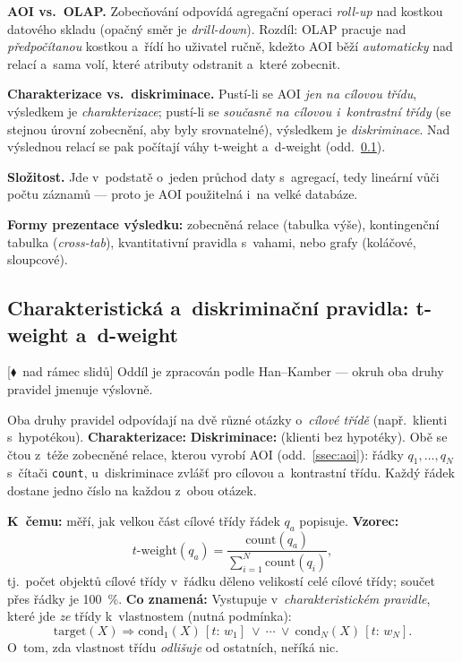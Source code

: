 \documentclass[11pt,a4paper]{article}
\theoremstyle{definition}
\newcommand{\mimo}{\textcolor{markcol}{\textsf{\footnotesize[$\blacklozenge$~nad rámec slidů]}}}
\begin{document}
\begin{poznbox}
\textbf{AOI vs.\ OLAP.} Zobecňování odpovídá agregační operaci \emph{roll-up} nad kostkou
datového skladu (opačný směr je \emph{drill-down}). Rozdíl: OLAP pracuje nad
\emph{předpočítanou} kostkou a~řídí ho uživatel ručně, kdežto AOI běží \emph{automaticky}
nad relací a~sama volí, které atributy odstranit a~které zobecnit.

\textbf{Charakterizace vs.\ diskriminace.} Pustí-li se AOI \emph{jen na cílovou třídu},
výsledkem je \emph{charakterizace}; pustí-li se \emph{současně na cílovou i~kontrastní třídy}
(se stejnou úrovní zobecnění, aby byly srovnatelné), výsledkem je \emph{diskriminace}.
Nad výslednou relací se pak počítají váhy t-weight a~d-weight (odd.~\ref{ssec:char-diskr}).

\textbf{Složitost.} Jde v~podstatě o~jeden průchod daty s~agregací, tedy lineární vůči počtu
záznamů --- proto je AOI použitelná i~na velké databáze.

\textbf{Formy prezentace výsledku:} zobecněná relace (tabulka výše), kontingenční tabulka
(\emph{cross-tab}), kvantitativní pravidla s~vahami, nebo grafy (koláčové, sloupcové).
\end{poznbox}

\subsection{Charakteristická a~diskriminační pravidla: t-weight a~d-weight}
\label{ssec:char-diskr}

\mimo{} Oddíl je zpracován podle Han--Kamber --- okruh oba druhy pravidel jmenuje
výslovně.

Oba druhy pravidel odpovídají na dvě různé otázky o~\emph{cílové třídě} (např.\ klienti
s~hypotékou). \textbf{Charakterizace:} 
\textbf{Diskriminace:}  (klienti bez
hypotéky). Obě se čtou z~téže zobecněné relace, kterou vyrobí AOI (odd.~\ref{ssec:aoi}):
řádky $q_1,\dots,q_N$ s~čítači \texttt{count}, u~diskriminace zvlášť pro cílovou
a~kontrastní třídu. Každý řádek dostane jedno číslo na každou z~obou otázek.

\begin{defbox}
\textbf{K~čemu:} měří, jak velkou část cílové třídy řádek $q_a$ popisuje.
\textbf{Vzorec:}
\[ t\text{-}\mathrm{weight}(q_a)=\frac{\mathrm{count}(q_a)}
   {\sum_{i=1}^{N}\mathrm{count}(q_i)}, \]
tj.\ počet objektů cílové třídy v~řádku děleno velikostí celé cílové třídy; součet přes
řádky je 100~\%. \textbf{Co znamená:}  Vystupuje v~\emph{charakteristickém pravidle}, které jde
\emph{ze} třídy k~vlastnostem (nutná podmínka):
\[ \mathrm{target}(X)\Rightarrow \mathrm{cond}_1(X)\,[t{:}\,w_1]\ \vee\ \cdots\ \vee\
   \mathrm{cond}_N(X)\,[t{:}\,w_N]. \]
O~tom, zda vlastnost třídu \emph{odlišuje} od ostatních, neříká nic.
\end{defbox}
\end{document}
